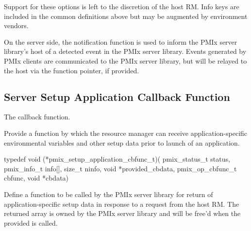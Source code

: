 Support for these options is left to the discretion of the host \ac{RM}. Info keys are included in the common definitions above but may be augmented by environment vendors.
\adviceuserend

\advicermstart
On the server side, the notification function is used to inform the \ac{PMIx} server library's host of a detected event in the \ac{PMIx} server library. Events generated by \ac{PMIx} clients are communicated to the \ac{PMIx} server library, but will be relayed to the host via the  function pointer, if provided.
\advicermend

\subsection{Server Setup Application Callback Function}

The  callback function.

\summary

Provide a function by which the resource manager can receive application-specific environmental variables and other setup data prior to launch of an application.

\format

\cspecificstart
\begin{codepar}
typedef void (*pmix_setup_application_cbfunc_t)(
                        pmix_status_t status,
                        pmix_info_t info[], size_t ninfo,
                        void *provided_cbdata,
                        pmix_op_cbfunc_t cbfunc, void *cbdata)
\end{codepar}
\cspecificend

\begin{arglist}
\end{arglist}

\descr

Define a function to be called by the \ac{PMIx} server library for return of application-specific setup data in response to a request from the host \ac{RM}. The returned  array is owned by the \ac{PMIx} server library and will be free'd when the provided  is called.


